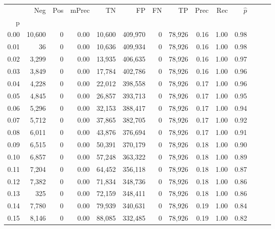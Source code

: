 \begin{tabular}{rrrrrrrrrrrrrr}
\toprule
{} &     Neg &    Pos & mPrec &       TN &       FP &      FN &      TP &  Prec &   Rec & $\hat{p}$ \\
p    &         &        &       &          &          &         &         &       &       &           \\
\midrule
0.00 &  10,600 &      0 &  0.00 &   10,600 &  409,970 &       0 &  78,926 &  0.16 &  1.00 &      0.98 \\
0.01 &      36 &      0 &  0.00 &   10,636 &  409,934 &       0 &  78,926 &  0.16 &  1.00 &      0.98 \\
0.02 &   3,299 &      0 &  0.00 &   13,935 &  406,635 &       0 &  78,926 &  0.16 &  1.00 &      0.97 \\
0.03 &   3,849 &      0 &  0.00 &   17,784 &  402,786 &       0 &  78,926 &  0.16 &  1.00 &      0.96 \\
0.04 &   4,228 &      0 &  0.00 &   22,012 &  398,558 &       0 &  78,926 &  0.17 &  1.00 &      0.96 \\
0.05 &   4,845 &      0 &  0.00 &   26,857 &  393,713 &       0 &  78,926 &  0.17 &  1.00 &      0.95 \\
0.06 &   5,296 &      0 &  0.00 &   32,153 &  388,417 &       0 &  78,926 &  0.17 &  1.00 &      0.94 \\
0.07 &   5,712 &      0 &  0.00 &   37,865 &  382,705 &       0 &  78,926 &  0.17 &  1.00 &      0.92 \\
0.08 &   6,011 &      0 &  0.00 &   43,876 &  376,694 &       0 &  78,926 &  0.17 &  1.00 &      0.91 \\
0.09 &   6,515 &      0 &  0.00 &   50,391 &  370,179 &       0 &  78,926 &  0.18 &  1.00 &      0.90 \\
0.10 &   6,857 &      0 &  0.00 &   57,248 &  363,322 &       0 &  78,926 &  0.18 &  1.00 &      0.89 \\
0.11 &   7,204 &      0 &  0.00 &   64,452 &  356,118 &       0 &  78,926 &  0.18 &  1.00 &      0.87 \\
0.12 &   7,382 &      0 &  0.00 &   71,834 &  348,736 &       0 &  78,926 &  0.18 &  1.00 &      0.86 \\
0.13 &     325 &      0 &  0.00 &   72,159 &  348,411 &       0 &  78,926 &  0.18 &  1.00 &      0.86 \\
0.14 &   7,780 &      0 &  0.00 &   79,939 &  340,631 &       0 &  78,926 &  0.19 &  1.00 &      0.84 \\
0.15 &   8,146 &      0 &  0.00 &   88,085 &  332,485 &       0 &  78,926 &  0.19 &  1.00 &      0.82 \\

\end{tabular}
